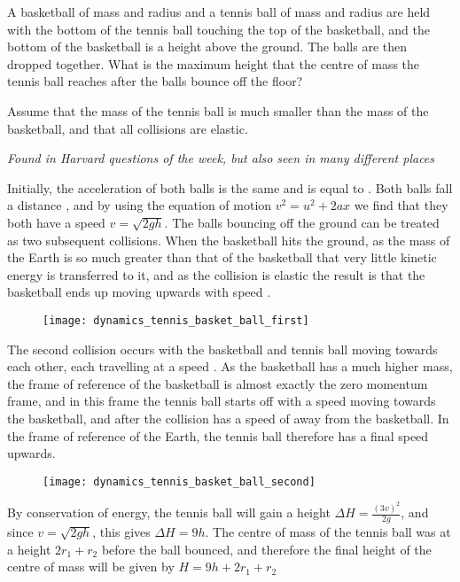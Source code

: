 \begin{problem}[Superball] 
{A basketball of mass  and radius   and a tennis ball of  mass  and radius  are held with the bottom of the tennis ball touching the top of the basketball, and the bottom of the basketball is a height  above the ground. The balls are then dropped together. What is the maximum height that the centre of mass the tennis ball reaches after the balls bounce off the floor?

Assume that the mass of the tennis ball is much smaller than the mass of the basketball, and that all collisions are elastic.
}
{\textit{Found in Harvard questions of the week, but also seen in many different places}}
{Initially, the acceleration of both balls is the same and is equal to . Both balls fall a distance  , and by using the equation of motion $v^2 = u^2 + 2ax$ we find that they both have a speed $v = \sqrt{2gh}$. The balls bouncing off the ground can be treated as two subsequent collisions. When the basketball hits the ground, as the mass of the Earth is so much greater than that of the basketball that very little kinetic energy is transferred to it, and as the collision is elastic the result is that the basketball ends up moving upwards with speed .

\begin{figure}[h]
\centering
\texttt{[image: dynamics\_tennis\_basket\_ball\_first]}
\caption{}
\label{fig:dynamics_tennis_basket_first}
\end{figure}

The second collision occurs with the basketball and tennis ball moving towards each other, each travelling at a speed . As the basketball has a much higher mass, the frame of reference of the basketball is almost exactly the zero momentum frame, and in this frame the tennis ball starts off with a speed  moving towards the basketball, and after the collision has a speed of  away from the basketball. In the frame of reference of the Earth, the tennis ball therefore has a final speed  upwards.

\begin{figure}[h]
\centering
\texttt{[image: dynamics\_tennis\_basket\_ball\_second]}
\caption{}
\label{fig:dynamics_tennis_basket_second}
\end{figure}


By conservation of energy, the tennis ball will gain a height $\Delta H = \frac{(3v)^2}{2g}$, and since $v = \sqrt{2gh}$, this gives $\Delta H = 9h$. The centre of mass of the tennis ball was at a height $2r_1 + r_2$ before the ball bounced, and therefore the final height of the centre of mass will be given by $H = 9h + 2r_1 + r_2$
}
\end{problem}